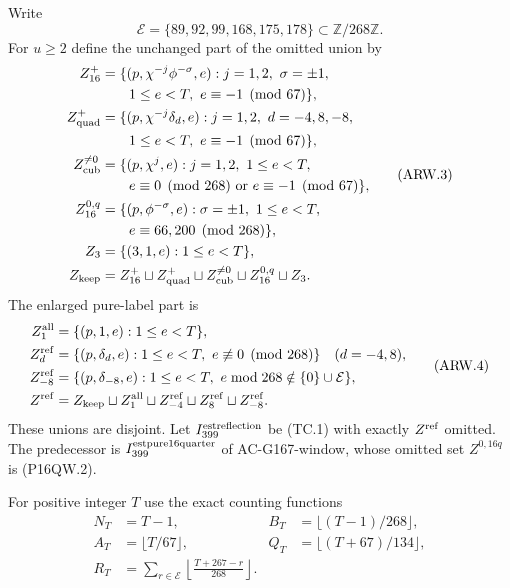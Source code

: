 Write
\[
 \mathcal E=\{89,92,99,168,175,178\}\subset\mathbb Z/268\mathbb Z.
 \tag{ARW.2}
\]
For $u\geq2$ define the unchanged part of the omitted union by
\[
 \begin{aligned}
 Z_{16}^+&=\{(p,\chi^{-j}\phi^{-\sigma},e):j=1,2,\ \sigma=\pm1,\\
 &\hspace{2em}1\leq e<T,\ e\equiv-1\pmod{67}\},\\
 Z_{\rm quad}^+&=\{(p,\chi^{-j}\delta_d,e):j=1,2,\ d=-4,8,-8,\\
 &\hspace{2em}1\leq e<T,\ e\equiv-1\pmod{67}\},\\
 Z_{\rm cub}^{\ne0}&=\{(p,\chi^j,e):j=1,2,\ 1\leq e<T,\\
 &\hspace{2em}e\equiv0\pmod{268}\ \text{or}\ e\equiv-1\pmod{67}\},\\
 Z_{16}^{0,q}&=\{(p,\phi^{-\sigma},e):\sigma=\pm1,\ 1\leq e<T,\\
 &\hspace{2em}e\equiv66,200\pmod{268}\},\\
 Z_3&=\{(3,1,e):1\leq e<T\},\\
 Z_{\rm keep}&=Z_{16}^+\sqcup Z_{\rm quad}^+
              \sqcup Z_{\rm cub}^{\ne0}\sqcup Z_{16}^{0,q}\sqcup Z_3.
 \end{aligned}
 \tag{ARW.3}
\]
The enlarged pure-label part is
\[
 \begin{aligned}
 Z_1^{\rm all}&=\{(p,1,e):1\leq e<T\},\\
 Z_d^{\rm ref}&=\{(p,\delta_d,e):1\leq e<T,\ e\not\equiv0\pmod{268}\}
                                  \quad(d=-4,8),\\
 Z_{-8}^{\rm ref}&=\{(p,\delta_{-8},e):1\leq e<T,
                        \ e\bmod268\notin\{0\}\cup\mathcal E\},\\
 Z^{\rm ref}&=Z_{\rm keep}\sqcup Z_1^{\rm all}
              \sqcup Z_{-4}^{\rm ref}\sqcup Z_8^{\rm ref}\sqcup Z_{-8}^{\rm ref}.
 \end{aligned}
 \tag{ARW.4}
\]
These unions are disjoint.  Let $I_{399}^{\rm estreflection}$ be
(TC.1) with exactly $Z^{\rm ref}$ omitted.  The predecessor is
$I_{399}^{\rm estpure16quarter}$ of AC-G167-window, whose omitted
set $Z^{0,16q}$ is (P16QW.2).

For positive integer $T$ use the exact counting functions
\[
 \begin{aligned}
 N_T&=T-1,& B_T&=\lfloor(T-1)/268\rfloor,\\
 A_T&=\lfloor T/67\rfloor,& Q_T&=\lfloor(T+67)/134\rfloor,\\
 R_T&=\sum_{r\in\mathcal E}\left\lfloor\frac{T+267-r}{268}\right\rfloor.
 \end{aligned}
 \tag{ARW.5}
\]

